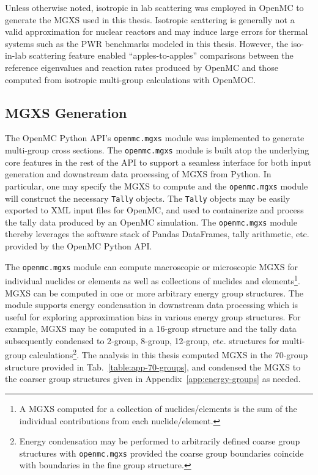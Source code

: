 Unless otherwise noted, isotropic in lab scattering was employed in OpenMC to generate the \ac{MGXS} used in this thesis. Isotropic scattering is generally not a valid approximation for nuclear reactors and may induce large errors for thermal systems such as the \ac{PWR} benchmarks modeled in this thesis. However, the iso-in-lab scattering feature enabled ``apples-to-apples'' comparisons between the reference eigenvalues and reaction rates produced by OpenMC and those computed from isotropic multi-group calculations with OpenMOC.

\subsection{MGXS Generation}
\label{subsec:chap4-mgxs}

The OpenMC Python \ac{API}'s \texttt{openmc.mgxs} module was implemented to generate multi-group cross sections. The \texttt{openmc.mgxs} module is built atop the underlying core features in the rest of the \ac{API} to support a seamless interface for both input generation and downstream data processing of \ac{MGXS} from Python. In particular, one may specify the \ac{MGXS} to compute and the \texttt{openmc.mgxs} module will construct the necessary \texttt{Tally} objects. The \texttt{Tally} objects may be easily exported to \ac{XML} input files for OpenMC, and used to containerize and process the tally data produced by an OpenMC simulation. The \texttt{openmc.mgxs} module thereby leverages the software stack of Pandas DataFrames, tally arithmetic, etc. provided by the OpenMC Python \ac{API}.

The \texttt{openmc.mgxs} module can compute macroscopic or microscopic \ac{MGXS} for individual nuclides or elements as well as collections of nuclides and elements\footnote{A \ac{MGXS} computed for a collection of nuclides/elements is the sum of the individual contributions from each nuclide/element.}. \ac{MGXS} can be computed in one or more arbitrary energy group structures. The module supports energy condensation in downstream data processing which is useful for exploring approximation bias in various energy group structures. For example, \ac{MGXS} may be computed in a 16-group structure and the tally data subsequently condensed to 2-group, 8-group, 12-group, etc. structures for multi-group calculations\footnote{Energy condensation may be performed to arbitrarily defined coarse group structures with \texttt{openmc.mgxs} provided the coarse group boundaries coincide with boundaries in the fine group structure.}. The analysis in this thesis computed \ac{MGXS} in the 70-group structure provided in Tab.~\ref{table:app-70-groups}, and condensed the \ac{MGXS} to the coarser group structures given in Appendix~\ref{app:energy-groups} as needed.

